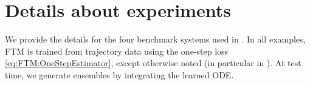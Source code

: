 \documentclass[oneside,11pt]{article}
\theoremstyle{remark}
\begin{document}
\section{Details about experiments}\label{appendix:Experiments}
We provide the details for the four benchmark systems used in
.  In all examples, FTM is trained from trajectory data
using the one-step loss \eqref{eq:FTM:OneStepEstimator}, except otherwise noted (in particular in ).  At test time, we
generate ensembles by integrating the learned ODE.
\end{document}
